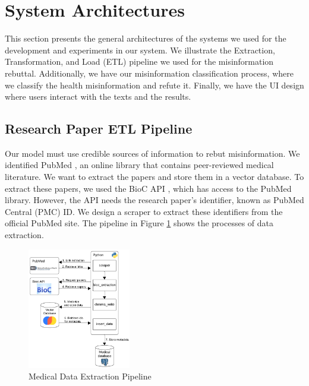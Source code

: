 
\section{System Architectures}

This section presents the general architectures of the systems we used for the development and experiments in our system. We illustrate the Extraction, Transformation, and Load (ETL) pipeline we used for the misinformation rebuttal. Additionally, we have our misinformation classification process, where we classify the health misinformation and refute it. Finally, we have the UI design where users interact with the texts and the results. 

\subsection{Research Paper ETL Pipeline}

Our model must use credible sources of information to rebut misinformation. We identified PubMed \cite{pubmed}, an online library that contains peer-reviewed medical literature. We want to extract the papers and store them in a vector database. To extract these papers, we used the BioC API \cite{bioinformatics}, which has access to the PubMed library. However, the API needs the research paper's identifier, known as PubMed Central (PMC) ID. We design a scraper to extract these identifiers from the official PubMed site. The pipeline in Figure \ref{fig:etl} shows the processes of data extraction. 

\begin{figure}[h]
	\begin{center}
		\includegraphics[width=0.4\textwidth]{figures/ETL_Pipeline.png} %
	\end{center}
	\caption{Medical Data Extraction Pipeline} %
	\label{fig:etl}
\end{figure}


